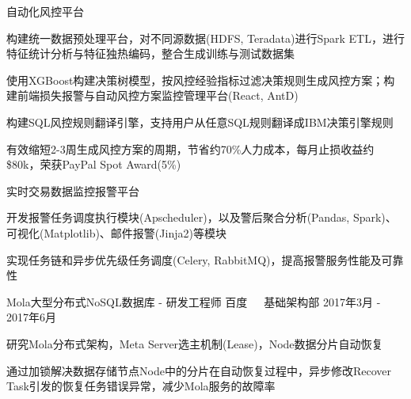 \documentclass[11pt, a4paper, UTF8]{awesome-cv}
\begin{document}
\begin{cventries}
  \cventry
    {自动化风控平台} %
    {} %
    {} %
    {\ } %
    {
      \begin{cvitems} %
        \item {构建统一数据预处理平台，对不同源数据(HDFS, Teradata)进行Spark ETL，进行特征统计分析与特征独热编码，整合生成训练与测试数据集}
        \item {使用XGBoost构建决策树模型，按风控经验指标过滤决策规则生成风控方案；构建前端损失报警与自动风控方案监控管理平台(React, AntD)}
        \item {构建SQL风控规则翻译引擎，支持用户从任意SQL规则翻译成IBM决策引擎规则}
        \item {有效缩短2-3周生成风控方案的周期，节省约70\%人力成本，每月止损收益约\$80k，荣获PayPal Spot Award(5\%)}
      \end{cvitems}
    }

  \cventry
    {实时交易数据监控报警平台} %
    {} %
    {} %
    {\ } %
    {
      \begin{cvitems} %
        \item {开发报警任务调度执行模块(Apscheduler)，以及警后聚合分析(Pandas, Spark)、可视化(Matplotlib)、邮件报警(Jinja2)等模块}
        \item {实现任务链和异步优先级任务调度(Celery, RabbitMQ)，提高报警服务性能及可靠性}
      \end{cvitems}
    }
    
  \cventry
    {Mola大型分布式NoSQL数据库 - 研发工程师} %
    {百度{\ \cdotp\ \ }基础架构部} %
    {2017年3月 - 2017年6月} %
    {\ } %
    {
      \begin{cvitems} %
        \item {研究Mola分布式架构，Meta Server选主机制(Lease)，Node数据分片自动恢复}
        \item {通过加锁解决数据存储节点Node中的分片在自动恢复过程中，异步修改Recover Task引发的恢复任务错误异常，减少Mola服务的故障率}
      \end{cvitems}
    }


\end{cventries}
\end{document}
